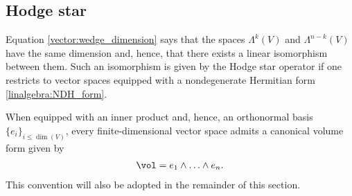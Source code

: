 \subsection{Hodge star}

    Equation \eqref{vector:wedge_dimension} says that the spaces $\Lambda^k(V)$ and $\Lambda^{n-k}(V)$ have the same dimension and, hence, that there exists a linear isomorphism between them. Such an isomorphism is given by the Hodge star operator if one restricts to vector spaces equipped with a nondegenerate Hermitian form \ref{linalgebra:NDH_form}.

    When equipped with an inner product and, hence, an orthonormal basis $\{e_i\}_{i\leq\dim(V)}$, every finite-dimensional vector space admits a canonical volume form given by
    \begin{gather}
        \vol = e_1\wedge\ldots\wedge e_n.
    \end{gather}
    This convention will also be adopted in the remainder of this section.


